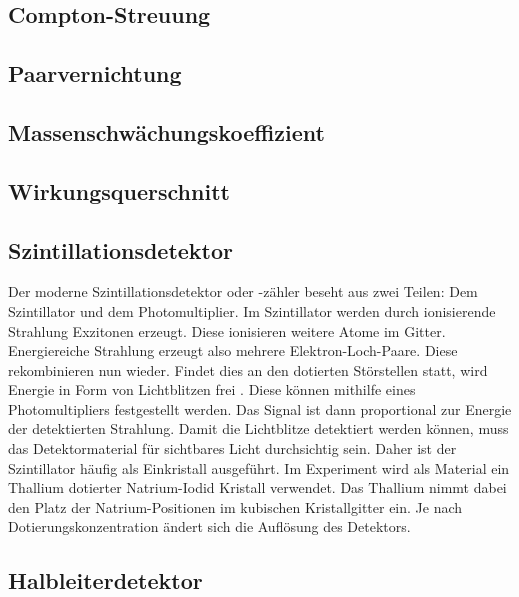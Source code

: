 \documentclass[
	parskip=half,10pt,
	numbers= noenddot, %
	toc=flat, %
	oneside,
	twocolumn,
	]{scrartcl}
\begin{document}
\subsection{Compton-Streuung}

\subsection{Paarvernichtung}

\subsection{Massenschwächungskoeffizient}

\subsection{Wirkungsquerschnitt}

\subsection{Szintillationsdetektor}

Der moderne Szintillationsdetektor oder -zähler beseht aus zwei Teilen: Dem Szintillator und dem Photomultiplier. Im Szintillator werden durch ionisierende Strahlung 
Exzitonen erzeugt. Diese ionisieren weitere Atome im Gitter. Energiereiche Strahlung erzeugt also mehrere Elektron-Loch-Paare. Diese rekombinieren nun wieder. 
Findet dies an den dotierten Störstellen statt, wird Energie in Form von Lichtblitzen frei \cite{kleinknecht}. Diese können mithilfe eines Photomultipliers 
festgestellt werden. Das Signal ist dann proportional zur Energie der detektierten Strahlung. Damit die Lichtblitze detektiert werden können, muss das Detektormaterial 
für sichtbares Licht durchsichtig sein. Daher ist der Szintillator 
häufig als Einkristall ausgeführt. Im Experiment wird als Material ein Thallium dotierter Natrium-Iodid Kristall verwendet. Das Thallium nimmt dabei den Platz der 
Natrium-Positionen im kubischen Kristallgitter ein. Je nach Dotierungskonzentration ändert sich die Auflösung des Detektors. 

\subsection{Halbleiterdetektor}
\end{document}
